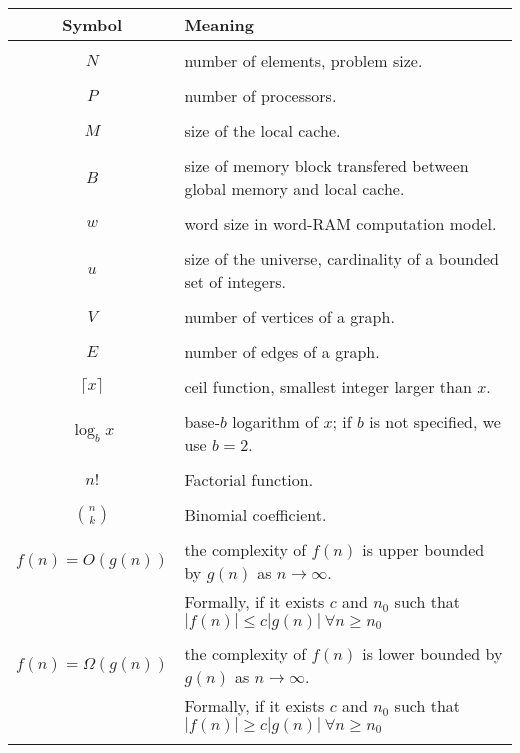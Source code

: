 {

\begin{tabular}{cp{130mm}}
  Symbol & Meaning \\
  \hline \\
  $N$ & number of elements, problem size. \\
  & \\
  $P$ & number of processors. \\
  & \\
  $M$ & size of the local cache\index{Cache}. \\
  & \\
  $B$ & size of memory block\index{Block} transfered between global memory and local cache. \\
  & \\
  $w$ & word size in word-RAM computation model. \\
  & \\
  $u$ & size of the universe, cardinality of a bounded set of integers. \\
  & \\
  $V$ & number of vertices of a graph. \\
  & \\
  $E$ & number of edges of a graph. \\
  & \\
  $\lceil x \rceil$ & ceil function, smallest integer larger than $x$. \\
  & \\
  $\log_{b} x$ & base-$b$ logarithm of $x$; if $b$ is not specified, we use $b = 2$. \\
  & \\
  $n!$ & Factorial function. \\
  & \\
  $\binom{n}{k}$ & Binomial coefficient. \\
  & \\
  $f(n) = O(g(n))$ & the complexity of $f(n)$ is upper bounded by $g(n)$ as $n \rightarrow \infty$. \\
  & Formally, if it exists $c$ and $n_{0}$ such that $|f(n)| \leq c|g(n)| ~ \forall n \geq n_{0}$ \\
  & \\
  $f(n) = \Omega(g(n))$ & the complexity of $f(n)$ is lower bounded by $g(n)$ as $n \rightarrow \infty$. \\
  & Formally, if it exists $c$ and $n_{0}$ such that $|f(n)| \geq c|g(n)| ~ \forall n \geq n_{0}$ \\
  & \\

\end{tabular}}
